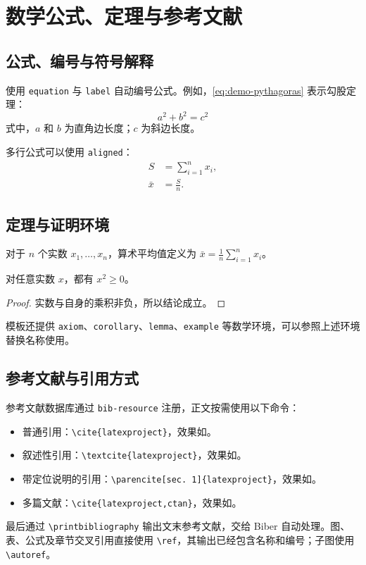 \chapter{数学公式、定理与参考文献}
\section{公式、编号与符号解释}
使用 \verb|equation| 与 \verb|label| 自动编号公式。例如，\ref{eq:demo-pythagoras} 表示勾股定理：
\begin{equation}
  a^2+b^2=c^2\label{eq:demo-pythagoras}
\end{equation}
\noindent 式中，$a$ 和 $b$ 为直角边长度；$c$ 为斜边长度。

多行公式可以使用 \texttt{aligned}：
\begin{equation}\label{eq:demo-aligned}
  \begin{aligned}
    S &= \sum_{i=1}^n x_i,\\
    \bar{x} &= \frac{S}{n}.
  \end{aligned}
\end{equation}

\section{定理与证明环境}
\begin{definition}[算术平均值]
对于 $n$ 个实数 $x_1,\dots,x_n$，算术平均值定义为 $\bar{x}=\frac{1}{n}\sum_{i=1}^n x_i$。
\end{definition}
\begin{theorem}[非负数的平方]
对任意实数 $x$，都有 $x^2\geq 0$。
\end{theorem}
\begin{proof}
实数与自身的乘积非负，所以结论成立。
\end{proof}

模板还提供 \texttt{axiom}、\texttt{corollary}、\texttt{lemma}、\texttt{example} 等数学环境，可以参照上述环境替换名称使用。

\section{参考文献与引用方式}
参考文献数据库通过 \texttt{bib-resource} 注册，正文按需使用以下命令：
\begin{itemize}
  \item 普通引用：\verb|\cite{latexproject}|，效果如\cite{latexproject}。
  \item 叙述性引用：\verb|\textcite{latexproject}|，效果如\textcite{latexproject}。
  \item 带定位说明的引用：\verb|\parencite[sec. 1]{latexproject}|，效果如\parencite[sec. 1]{latexproject}。
  \item 多篇文献：\verb|\cite{latexproject,ctan}|，效果如\cite{latexproject,ctan}。
\end{itemize}
最后通过 \verb|\printbibliography| 输出文末参考文献，交给 Biber 自动处理。图、表、公式及章节交叉引用直接使用 \verb|\ref|，其输出已经包含名称和编号；子图使用 \verb|\autoref|。
